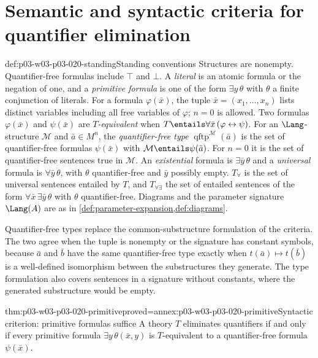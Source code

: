 \section{Semantic and syntactic criteria for quantifier elimination}
\label{sec:p03-w03-p03-020-criteria}

\begin{hbconvention}{def:p03-w03-p03-020-standing}{Standing conventions}
Structures are nonempty. Quantifier-free formulas include \(\top\) and
\(\bot\). A \emph{literal} is an atomic formula or the negation of one, and a
\emph{primitive formula} is one of the form \(\exists y\,\theta\) with
\(\theta\) a finite conjunction of literals. For a formula
\(\varphi(\bar x)\), the tuple \(\bar x=(x_1,\ldots,x_n)\) lists distinct
variables including all free variables of \(\varphi\); \(n=0\) is allowed.
Two formulas \(\varphi(\bar x)\) and \(\psi(\bar x)\) are
\emph{\(T\)-equivalent} when
\(T\entails\forall\bar x\,(\varphi\leftrightarrow\psi)\).
For an \(\Lang\)-structure \(\mathcal M\) and \(\bar a\in M^n\), the
\emph{quantifier-free type}
\(\operatorname{qftp}^{\mathcal M}(\bar a)\) is the set of quantifier-free
formulas \(\psi(\bar x)\) with \(\mathcal M\entails\psi(\bar a)\). For
\(n=0\) it is the set of quantifier-free sentences true in \(\mathcal M\).
An \emph{existential} formula is \(\exists\bar y\,\theta\) and a
\emph{universal} formula is \(\forall\bar y\,\theta\), with \(\theta\)
quantifier-free and \(\bar y\) possibly empty. \(T_\forall\) is the set of
universal sentences entailed by \(T\), and \(T_{\forall\exists}\) the set of
entailed sentences of the form \(\forall\bar x\,\exists\bar y\,\theta\) with
\(\theta\) quantifier-free. Diagrams and the parameter signature
\(\Lang(A)\) are as in \cref{def:parameter-expansion,def:diagrams}.
\end{hbconvention}

Quantifier-free types replace the common-substructure formulation of the
criteria. The two agree when the tuple is nonempty or the signature has
constant symbols, because \(\bar a\) and \(\bar b\) have the same
quantifier-free type exactly when \(t(\bar a)\mapsto t(\bar b)\) is a
well-defined isomorphism between the substructures they generate. The type
formulation also covers sentences in a signature without constants, where the
generated substructure would be empty.

\begin{hbtheorem}{thm:p03-w03-p03-020-primitive}{proved=annex:p03-w03-p03-020-primitive}{Syntactic criterion: primitive formulas suffice}
A theory \(T\) eliminates quantifiers if and only if every primitive formula
\(\exists y\,\theta(\bar x,y)\) is \(T\)-equivalent to a quantifier-free
formula \(\psi(\bar x)\).
\end{hbtheorem}

